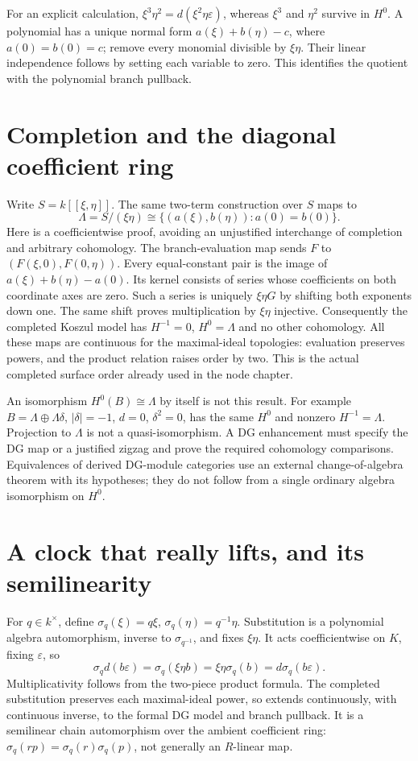 For an explicit calculation,
$\xi^3\eta^2=d(\xi^2\eta\varepsilon)$, whereas $\xi^3$ and $\eta^2$
survive in $H^0$. A polynomial has a unique normal form
$a(\xi)+b(\eta)-c$, where $a(0)=b(0)=c$; remove every monomial divisible
by $\xi\eta$. Their linear independence follows by setting each variable
to zero. This identifies the quotient with the polynomial branch pullback.

\section{Completion and the diagonal coefficient ring}
Write $S=k[[\xi,\eta]]$. The same two-term construction over $S$ maps to
\[
 \Lambda=S/(\xi\eta)\cong
 \{(a(\xi),b(\eta)):a(0)=b(0)\}.
\]
Here is a coefficientwise proof, avoiding an unjustified interchange of
completion and arbitrary cohomology. The branch-evaluation map sends
$F$ to $(F(\xi,0),F(0,\eta))$. Every equal-constant pair is the image of
$a(\xi)+b(\eta)-a(0)$. Its kernel consists of series whose coefficients
on both coordinate axes are zero. Such a series is uniquely $\xi\eta G$
by shifting both exponents down one. The same shift proves multiplication
by $\xi\eta$ injective. Consequently the completed Koszul model has
$H^{-1}=0$, $H^0=\Lambda$ and no other cohomology. All these maps are
continuous for the maximal-ideal topologies: evaluation preserves powers,
and the product relation raises order by two. This is the actual completed
surface order already used in the node chapter.

An isomorphism $H^0(B)\cong\Lambda$ by itself is not this result.
For example $B=\Lambda\oplus\Lambda\delta$, $|\delta|=-1$, $d=0$,
$\delta^2=0$, has the same $H^0$ and nonzero $H^{-1}=\Lambda$.
Projection to $\Lambda$ is not a quasi-isomorphism. A DG enhancement must
specify the DG map or a justified zigzag and prove the required cohomology
comparisons. Equivalences of derived DG-module categories use an external
change-of-algebra theorem with its hypotheses; they do not follow from a
single ordinary algebra isomorphism on $H^0$.

\section{A clock that really lifts, and its semilinearity}
For $q\in k^\times$, define $\sigma_q(\xi)=q\xi$,
$\sigma_q(\eta)=q^{-1}\eta$. Substitution is a polynomial algebra
automorphism, inverse to $\sigma_{q^{-1}}$, and fixes $\xi\eta$.
It acts coefficientwise on $K$, fixing $\varepsilon$, so
\[
 \sigma_q d(b\varepsilon)=\sigma_q(\xi\eta b)
 =\xi\eta\sigma_q(b)=d\sigma_q(b\varepsilon).
\]
Multiplicativity follows from the two-piece product formula. The completed
substitution preserves each maximal-ideal power, so extends continuously,
with continuous inverse, to the formal DG model and branch pullback.
It is a semilinear chain automorphism over the ambient coefficient ring:
$\sigma_q(rp)=\sigma_q(r)\sigma_q(p)$, not generally an $R$-linear map.

